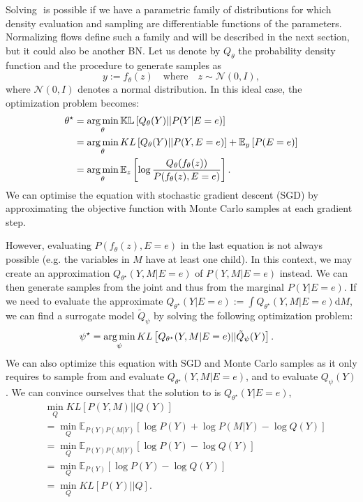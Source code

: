 Solving $\label{eq:obj_VI}$ is possible if we have a parametric family of distributions for which density evaluation and sampling are differentiable functions of the parameters. Normalizing flows define such a family and will be described in the next section, but it could also be another BN. Let us denote by $Q_\theta$ the probability density function and the procedure to generate samples as $$ y := f_\theta(z) \quad\text{where}\quad z\sim \mathcal{N}(0, I),$$
where $\mathcal{N}(0, I)$ denotes a normal distribution.
In this ideal case, the optimization problem becomes:
\begin{align}
  \theta^\star &= \operatorname*{arg\,min}_\theta \mathbb{KL}\left[Q_\theta(Y)||P(Y|E=e) \right]\\
  &= \operatorname*{arg\,min}_\theta KL\left[Q_\theta(Y)||P(Y, E=e) \right] + \mathbb{E}_{y}\left[P(E=e)\right]\\
  &= \operatorname*{arg\,min}_\theta \mathbb{E}_{z}\left[ \log \frac{Q_\theta(f_\theta(z))}{P(f_\theta(z), E=e)} \right].
\end{align}
We can optimise the equation with stochastic gradient descent (SGD) by approximating the objective function with Monte Carlo samples at each gradient step.

However, evaluating $P(f_\theta(z), E=e)$ in the last equation is not always possible (e.g. the variables in $M$ have at least one child). In this context, we may create an approximation $Q_{\theta^\star}(Y, M|E=e)$ of $P(Y, M|E=e)$ instead. We can then generate samples from the joint and thus from the marginal $P(Y|E=e)$. If we need to evaluate the approximate $Q_{\theta^\star}(Y|E=e) := \int Q_{\theta^\star}(Y, M|E=e) \text{d}M$, we can find a surrogate model $\tilde Q_\psi$ by solving the following optimization problem:
\begin{align}
  \psi^\star &= \operatorname*{arg\,min}_\psi KL\left[Q_{\theta^\star}(Y, M|E=e)||\tilde Q_\psi(Y) \right]. \label{eq:approx_posterior}
\end{align}
We can also optimize this equation with SGD and Monte Carlo samples as it only requires to sample from and evaluate $Q_{\theta^\star}(Y, M|E=e)$, and to evaluate $Q_\psi(Y)$. We can convince ourselves that the solution to  is $Q_{\theta^\star}(Y|E=e)$,
\begin{align}
  &\min_Q KL\left[P(Y, M)||Q(Y) \right]\\
  &=\min_Q \mathbb{E}_{P(Y) P(M|Y)}\left[\log P(Y) + \log P(M|Y) - \log Q(Y)\right]\\
  &=\min_Q \mathbb{E}_{P(Y) P(M|Y)}\left[\log P(Y) - \log Q(Y)\right]\\
  &= \min_Q \mathbb{E}_{P(Y)}\left[\log P(Y) - \log Q(Y)\right]\\
  &= \min_Q KL\left[P(Y)||Q \right].
\end{align}


